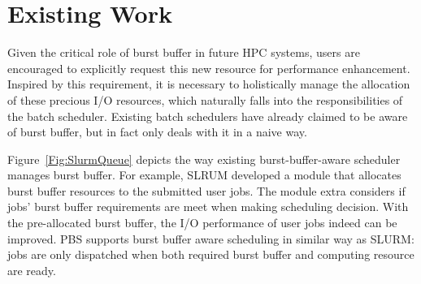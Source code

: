 \section{Existing Work}
\label{Sec:RelatedWorks}

\begin{figure}[h]
\centering
{}
\caption{}
\label{Fig:CompareSlurmCerbuers}
\end{figure}

Given the critical role of burst buffer in future HPC systems,
users are encouraged to explicitly request this new resource for performance enhancement\cite{apex-workflow}.
Inspired by this requirement, it is necessary to holistically manage
the allocation of these precious I/O resources,
which naturally falls into the responsibilities of the batch scheduler.
Existing batch schedulers \cite{Moab, Cobalt, SlurmBBGuide, PBSonCRAY} have already claimed to
be aware of burst buffer, but in fact only deals with it in a naive way.

Figure~\ref{Fig:SlurmQueue} depicts the way existing burst-buffer-aware scheduler manages burst buffer.
For example, SLRUM developed a module that allocates burst buffer resources to the submitted user jobs.
The module extra considers if jobs' burst buffer requirements are meet when making scheduling decision.
With the pre-allocated burst buffer,
the I/O performance of user jobs indeed can be improved\cite{SlurmBBGuide}.
PBS supports burst buffer aware scheduling in similar way as SLURM:
jobs are only dispatched when both required burst buffer and computing resource are ready\cite{PBSonCRAY}.

